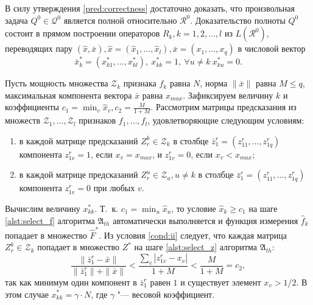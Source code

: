 \begin{Proof}
	В силу утверждения \ref{pred:correctness} достаточно доказать, что произвольная задача $Q^0\in\mathcal Q^0$ является полной относительно $\mathcal R^0$. Доказательство полноты $Q^0$ состоит в прямом построении операторов $R_k, k=1,2,\dots,l$ из $L(\mathcal R^0)$, переводящих пару $(\hat{x},\bar{x}), \hat{x}=(\hat{x}_1,\dots,\hat{x}_l), \bar{x}=(x_1,\dots,x_q)$ в числовой вектор
	\begin{equation} \label{crit:fillness}
		\bar{x}_k^*=(x_{k1}^*,\dots,x_{kl}^*),\ x_{kk}^*=1,\ \forall u\neq k\ x_{ku}^*=0.
	\end{equation} 
	
	Пусть мощность множества $\mathcal Z_k$ признака $f_k$ равна $N$, норма $\|\bar x\|$ равна $M{\leqslant}q$, максимальная компонента вектора $\bar{x}$ равна $x_{max}$. Зафиксируем величину $k$ и коэффициенты $c_1=\min_v\hat x_v, c_2=\frac{M}{1+M}$. Рассмотрим матрицы предсказания из множеств $\mathcal{Z}_1,\dots,\mathcal{Z}_l$ признаков $f_1,\dots,f_l$, удовлетворяющие следующим условиям:
	
 \begin{enumerate}
	 	\item в каждой матрице предсказаний $Z_r^k\in\mathcal Z_k$ в столбце $\bar{z}_1^r=(z_{11}^r,\dots,z_{1q}^r)$ компонента $z_{1v}^r=1$, если $x_v=x_{max}$, и $z_{1v}^r=0$, если $x_v<x_{max}$; \label{cond:ii}
	 	
	 	\item в каждой матрице предсказаний $Z_r^u\in\mathcal Z_u, u\neq k$ в столбце $\bar{z}_1^r=(z_{11}^r,\dots,z_{1q}^r)$ компонента $z_{1v}^r=0$ при любых $v$. \label{cond:ij}
 \end{enumerate}
 
 Вычислим величину $x_{kk}^*$. Т.~к. $c_1=\min_u\hat x_u$, то условие $\hat x_k\geqslant c_1$ на шаге \ref{alst:select_f} алгоритма $\mathfrak A_{th}$ автоматически выполняется и функция измерения $\hat f_k$ попадает в множество $\hat F^*$. Из условия \ref{cond:ii} следует, что каждая матрица $Z_r^k\in\mathcal Z_k$ попадает в множество $Z^*$ на шаге \ref{alst:select_z} алгоритма $\mathfrak A_{th}$:
 \begin{equation}
 	\frac{\|\bar{z}_1^r-\bar{x}\|}{\|\bar{z}_1^r\|+\|\bar{x}\|}<\frac{\sum_v|z_{1v}^r-x_v|}{1+M}<\frac{M}{1+M}=c_2,
 \end{equation}
 так как минимум один компонент в $\bar{z}_1^r$ равен $1$ и существует элемент $x_v>1/2$. В этом случае $x_{kk}^*=\gamma{\cdot}N$, где $\gamma$ "--- весовой коэффициент.
 

\end{Proof}
